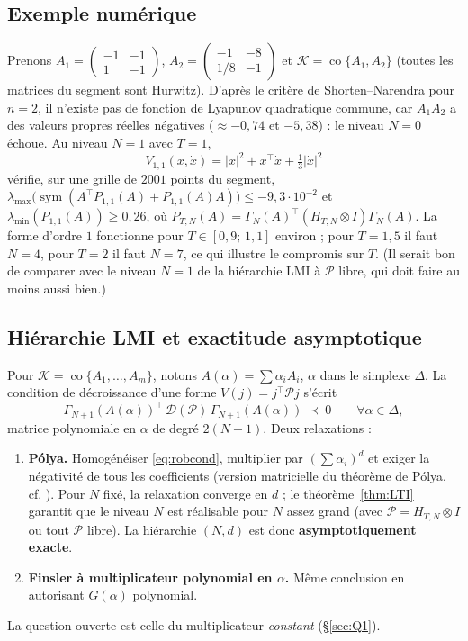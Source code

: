 \documentclass[11pt,a4paper]{article}
\theoremstyle{definition}
\theoremstyle{remark}
\newcommand{\tr}{^{\top}}
\newcommand{\sym}{\operatorname{sym}}
\newcommand{\co}{\operatorname{co}}
\begin{document}
\subsection{Exemple numérique}
Prenons $A_1 = \begin{pmatrix}-1&-1\\1&-1\end{pmatrix}$, $A_2 = \begin{pmatrix}-1&-8\\1/8&-1\end{pmatrix}$ et $\mathcal K = \co\{A_1,A_2\}$ (toutes les matrices du segment sont Hurwitz). D'après le critère de Shorten–Narendra pour $n=2$, il n'existe pas de fonction de Lyapunov quadratique commune, car $A_1A_2$ a des valeurs propres réelles négatives ($\approx-0{,}74$ et $-5{,}38$) : le niveau $N=0$ échoue. Au niveau $N=1$ avec $T=1$,
\[
V_{1,1}(x,\dot x) = |x|^2 + x\tr\dot x + \tfrac13|\dot x|^2
\]
vérifie, sur une grille de $2001$ points du segment, $\lambda_{\max}\big(\sym(A\tr P_{1,1}(A)+P_{1,1}(A)A)\big)\le -9{,}3\cdot10^{-2}$ et $\lambda_{\min}(P_{1,1}(A))\ge 0{,}26$, où $P_{T,N}(A) = \Gamma_N(A)\tr(H_{T,N}\otimes I)\Gamma_N(A)$. La forme d'ordre $1$ fonctionne pour $T\in[0{,}9;\,1{,}1]$ environ ; pour $T=1{,}5$ il faut $N=4$, pour $T=2$ il faut $N=7$, ce qui illustre le compromis sur $T$. (Il serait bon de comparer avec le niveau $N=1$ de la hiérarchie LMI à $\mathcal P$ libre, qui doit faire au moins aussi bien.)

\subsection{Hiérarchie LMI et exactitude asymptotique}\label{sec:hierarchie}
Pour $\mathcal K = \co\{A_1,\dots,A_m\}$, notons $A(\alpha) = \sum\alpha_iA_i$, $\alpha$ dans le simplexe $\Delta$. La condition de décroissance d'une forme $V(j) = j\tr\mathcal Pj$ s'écrit
\begin{equation}\label{eq:robcond}
\Gamma_{N+1}(A(\alpha))\tr\,\mathcal D(\mathcal P)\,\Gamma_{N+1}(A(\alpha))\ \prec\ 0\qquad\forall\alpha\in\Delta,
\end{equation}
matrice polynomiale en $\alpha$ de degré $2(N+1)$. Deux relaxations :
\begin{enumerate}[nosep,label=(\alph*)]
\item \textbf{Pólya.} Homogénéiser \eqref{eq:robcond}, multiplier par $(\sum\alpha_i)^d$ et exiger la négativité de tous les coefficients (version matricielle du théorème de Pólya, cf. \cite{Scherer,OP}). Pour $N$ fixé, la relaxation converge en $d$ ; le théorème~\ref{thm:LTI} garantit que le niveau $N$ est réalisable pour $N$ assez grand (avec $\mathcal P = H_{T,N}\otimes I$ ou tout $\mathcal P$ libre). La hiérarchie $(N,d)$ est donc \textbf{asymptotiquement exacte}.
\item \textbf{Finsler à multiplicateur polynomial en $\alpha$.} Même conclusion en autorisant $G(\alpha)$ polynomial.
\end{enumerate}
La question ouverte est celle du multiplicateur \emph{constant} (\S\ref{sec:Q1}).
\end{document}
